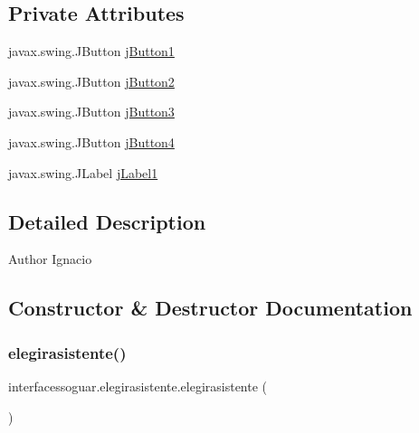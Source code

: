 \subsection*{Private Attributes}
\begin{DoxyCompactItemize}
\item 
javax.\+swing.\+J\+Button \mbox{\hyperlink{classinterfacessoguar_1_1elegirasistente_a07a589d7d398109bec67c508df5c7ecd}{j\+Button1}}
\item 
javax.\+swing.\+J\+Button \mbox{\hyperlink{classinterfacessoguar_1_1elegirasistente_a6522f7eb0d070434d11b803b11bcd34b}{j\+Button2}}
\item 
javax.\+swing.\+J\+Button \mbox{\hyperlink{classinterfacessoguar_1_1elegirasistente_a856391f7b77755ef9c4272b75d0e7d08}{j\+Button3}}
\item 
javax.\+swing.\+J\+Button \mbox{\hyperlink{classinterfacessoguar_1_1elegirasistente_a5b4ead7537cc84f35f56c57ca95f3217}{j\+Button4}}
\item 
javax.\+swing.\+J\+Label \mbox{\hyperlink{classinterfacessoguar_1_1elegirasistente_af27c9b11cea62f6c96b7ebb47653e9de}{j\+Label1}}
\end{DoxyCompactItemize}


\subsection{Detailed Description}
\begin{DoxyAuthor}{Author}
Ignacio 
\end{DoxyAuthor}


\subsection{Constructor \& Destructor Documentation}
\mbox{\label{classinterfacessoguar_1_1elegirasistente_ae52ebd382dfff12ce74deef5f47afdf7}} 
\subsubsection{\texorpdfstring{elegirasistente()}{elegirasistente()}}
{\footnotesize\ttfamily interfacessoguar.\+elegirasistente.\+elegirasistente (\begin{DoxyParamCaption}{ }\end{DoxyParamCaption})\hspace{0.3cm}{\ttfamily [inline]}}

